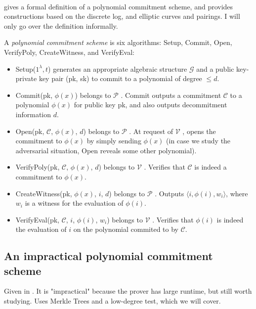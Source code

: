 \documentclass[11pt]{article}
\newcommand{\prover}{$\mathcal{P}$ }
\newcommand{\verifier}{$\mathcal{V}$ }
\begin{document}
\paragraph{} \cite{kzg10} gives a formal definition of a polynomial commitment scheme, and provides constructions based on the discrete log, and elliptic curves and pairings. I will only go over the definition informally.

\begin{definition}
    A \textit{polynomial commitment scheme} is six algorithms: Setup, Commit, Open, VerifyPoly, CreateWitness, and VerifyEval:
    \begin{itemize}
        \item Setup($1^\lambda, t$) generates an appropriate algebraic structure $\mathcal{G}$ and a public key-private key pair (pk, sk) to commit to a polynomial of degree $\leq d$.
        \item Commit(pk, $\phi(x)$) belongs to \prover. Commit outputs a commitment $\mathcal{C}$ to a polynomial $\phi(x)$ for public key pk, and also outputs decommitment information $d$.
        \item Open(pk, $\mathcal{C}$, $\phi(x)$, $d$) belongs to \prover. At request of \verifier, opens the commitment to $\phi(x)$ by simply sending $\phi(x)$ (in case we study the adversarial situation, Open reveals some other polynomial).
        \item VerifyPoly(pk, $\mathcal{C}$, $\phi(x)$, $d$) belongs to \verifier. Verifies that $\mathcal{C}$ is indeed a commitment to $\phi(x)$.
        \item CreateWitness(pk, $\phi(x)$, $i$, $d$) belongs to \prover. Outputs $\langle i, \phi(i), w_i \rangle$, where $w_i$ is a witness for the evaluation of $\phi(i)$.
        \item VerifyEval(pk, $\mathcal{C}$, $i$, $\phi(i)$, $w_i$) belongs to \verifier. Verifies that $\phi(i)$ is indeed the evaluation of $i$ on the polynomial commited to by $\mathcal{C}$.
    \end{itemize}
\end{definition}

\subsection{An impractical polynomial commitment scheme} Given in \cite{tha22}. It is "impractical" because the prover has large runtime, but still worth studying. Uses Merkle Trees and a low-degree test, which we will cover.
\end{document}
